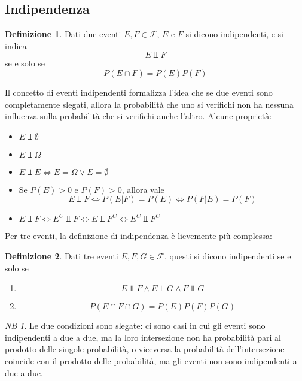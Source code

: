 \documentclass{article}
\theoremstyle{plain}
\theoremstyle{definition}
\newtheorem{definizione}{Definizione}[section]
\theoremstyle{remark}
\newtheorem*{NB}{NB}
\begin{document}
\subsection{Indipendenza} %
\label{sub:indipendenza}
\begin{definizione}
	Dati due eventi $E,F\in\mathcal{F}$, $E$ e $F$ si dicono indipendenti, e si indica
	\begin{equation*}
		E\Bot F
	\end{equation*}
	se e solo se
	\begin{equation*}
		P(E\cap F)=P(E)P(F)
	\end{equation*}
\end{definizione}
Il concetto di eventi indipendenti formalizza l'idea che se due eventi sono completamente slegati, allora la probabilità che uno si verifichi non ha nessuna influenza sulla probabilità che si verifichi anche l'altro. Alcune proprietà:
\begin{itemize}
	\item $E\Bot \emptyset$
	\item $E\Bot\Omega$
	\item $E\Bot E\Leftrightarrow E=\Omega\vee E=\emptyset$
	\item Se $P(E)>0$ e $P(F)>0$, allora vale
	\begin{equation*}
		E\Bot F\Leftrightarrow P(E|F)=P(E) \Leftrightarrow P(F|E)=P(F)
	\end{equation*}
	\item $E\Bot F\Leftrightarrow E^C\Bot F\Leftrightarrow E\Bot F^C\Leftrightarrow E^C\Bot F^C$
\end{itemize}
Per tre eventi, la definizione di indipendenza è lievemente più complessa:
\begin{definizione}
	Dati tre eventi $E,F,G\in\mathcal{F}$, questi si dicono indipendenti se e solo se
	\begin{enumerate}
		\item
		\begin{equation*}
			E\Bot F\wedge E\Bot G\wedge F\Bot G
		\end{equation*}
		\item 
		\begin{equation*}
			P(E\cap F\cap G)=P(E)P(F)P(G)
		\end{equation*}
	\end{enumerate}
\end{definizione}
\begin{NB}
	Le due condizioni sono slegate: ci sono casi in cui gli eventi sono indipendenti a due a due, ma la loro intersezione non ha probabilità pari al prodotto delle singole probabilità, o viceversa la probabilità dell'intersezione coincide con il prodotto delle probabilità, ma gli eventi non sono indipendenti a due a due.
\end{NB}
\end{document}
